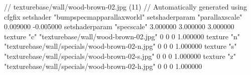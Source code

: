 // texturebase/wall/wood-brown-02.jpg (11)
// Automatically generated using cfgfix
setshader "bumpspecmapparallaxworld"
setshaderparam "parallaxscale" 0.009000 -0.005000
setshaderparam "specscale" 3.000000 3.000000 3.000000
texture "c" "texturebase/wall/wood-brown-02.jpg" 0 0 0 1.000000
texture "n" "texturebase/wall/specials/wood-brown-02-n.jpg" 0 0 0 1.000000
texture "s" "texturebase/wall/specials/wood-brown-02-s.jpg" 0 0 0 1.000000
texture "z" "texturebase/wall/specials/wood-brown-02-h.jpg" 0 0 0 1.000000
